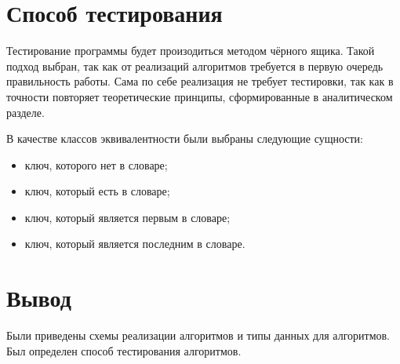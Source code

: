 \section{Способ тестирования}
Тестирование программы будет произодиться методом чёрного ящика.
Такой подход выбран, так как от реализаций алгоритмов требуется в первую
очередь правильность работы.
Сама по себе реализация не требует тестировки, так как в точности
повторяет теоретические принципы, сформированные в аналитическом
разделе.

В качестве классов эквивалентности были выбраны следующие сущности:
\begin{itemize}
	\item ключ, которого нет в словаре;
	\item ключ, который есть в словаре;
	\item ключ, который является первым в словаре;
	\item ключ, который является последним в словаре.
\end{itemize}

\section{Вывод}
Были приведены схемы реализации алгоритмов и типы данных для алгоритмов.
Был определен способ тестирования алгоритмов.